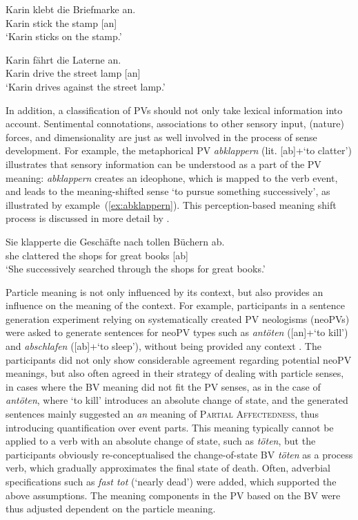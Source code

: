 \documentclass[output=paper]{langsci/langscibook}
\begin{document}
\ea\label{ex:ankleben}
\gll Karin klebt die Briefmarke an.\\
Karin stick the stamp [an]\\
\glt `Karin sticks on the stamp.'
\z

\ea\label{ex:anfahrenLaterne1}
\gll Karin fährt die Laterne an.\\
Karin drive the {street lamp} [an]\\
\glt `Karin drives against the street lamp.'
\z

In addition, a classification of PVs should not only take lexical
information into account. Sentimental connotations, associations to
other sensory input, (nature) forces, and dimensionality are just as
well involved in the process of sense development. For example, the
metaphorical PV \textit{abklappern} (lit. [ab]+`to clatter')
illustrates that sensory information can be understood as a part of
the PV meaning: \textit{abklappern} creates an ideophone, which is
mapped to the verb event, and leads to the meaning-shifted sense `to
pursue something successively', as illustrated by
example~(\ref{ex:abklappern}). This perception-based meaning shift
process is discussed in more detail by \cite{SpringorumEtAl:13}.

\ea\label{ex:abklappern}
\gll Sie klapperte die Geschäfte nach tollen Büchern ab.\\
she clattered the shops for great books [ab]\\
\glt `She successively searched through the shops for great books.'
\z

Particle meaning is not only influenced by its context, but also
provides an influence on the meaning of the context. For example,
participants in a sentence generation experiment relying on
systematically created PV neologisms (neoPVs) were asked to generate
sentences for neoPV types such as \textit{antöten} ([an]+`to kill')
and \textit{abschlafen} ([ab]+`to sleep'), without being provided any
context \citep{SpringorumEtAl:13cALTER}. The participants did not only
show considerable agreement regarding potential neoPV meanings, but
also often agreed in their strategy of dealing with particle senses,
in cases where the BV meaning did not fit the PV senses, as in the
case of \textit{antöten}, where `to kill' introduces an absolute
change of state, and the generated sentences mainly suggested an
\textit{an} meaning of \textsc{Partial Affectedness}, thus introducing
quantification over event parts. This meaning typically cannot be
applied to a verb with an absolute change of state, such as
\textit{töten}, but the participants obviously re-conceptualised the
change-of-state BV \textit{töten} as a process verb, which gradually
approximates the final state of death. Often, adverbial specifications
such as \textit{fast tot} (`nearly dead') were added, which supported
the above assumptions. The meaning components in the PV based on the
BV were thus adjusted dependent on the particle meaning.
\end{document}
